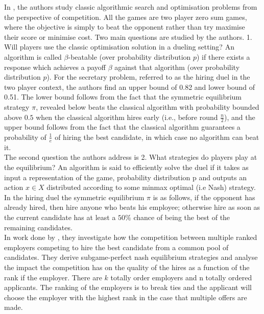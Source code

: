 \documentclass{article}
\begin{document}
In \cite{immorlica2011dueling}, the authors  study classic algorithmic search and optimisation problems from the perspective of competition. All the games are two player zero sum games, where the objective is simply to beat the opponent rather than try maximise their score or minimise cost. Two main questions are studied by the authors. 1. Will players use the classic optimisation solution in a dueling setting? An algorithm is called $\beta$-beatable (over probability distribution $p$) if there exists a response which achieves a payoff $\beta$ against that algorithm (over probability distribution $p$). For the secretary problem, referred to as the hiring duel in the two player context, the authors find an upper bound of 0.82 and lower bound of 0.51. The lower bound follows from the fact that the symmetric equilibrium strategy $\pi$, revealed below beats the classical algorithm with probability bounded above $0.5$ when the classical algorithm hires early (i.e., before round $\frac{n}{2}$), and the upper bound follows from the fact that the classical algorithm guarantees a probability of $\frac{1}{e}$ of hiring the best candidate, in which case no algorithm can beat it.
\\[2ex]
The second question the authors address is 2. What strategies do players play at the equilibrium? An algorithm is said to efficiently solve the duel if it takes as input a representation of the game, probability distribution p and outputs an action $x \in X$ distributed according to some minmax optimal (i.e Nash) strategy. In the hiring duel the symmetric equilibrium $\pi $ is as follows, if the opponent has already hired, then hire anyone who  beats his employee; otherwise hire as soon as the current candidate has at least a $50\%$ chance of being the best of the remaining candidates.
\\[2ex]
In work done by \cite{karlin2015competitive}, they investigate how the competition between multiple ranked employers competing to hire the best candidate from a common pool of candidates. They derive subgame-perfect nash equilibrium strategies and analyse the impact the competition has on the quality of the hires as a function of the rank if the employer. There are $k$ totally order employers and n totally ordered applicants. The ranking of the employers is to break ties and the applicant will choose the employer with the highest rank in the case that multiple offers are made.
\\[2ex]
\end{document}
